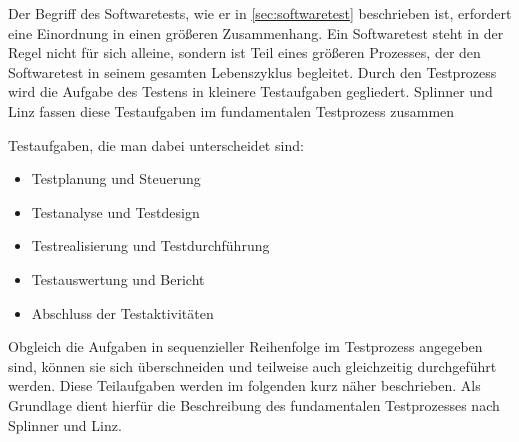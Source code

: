Der Begriff des Softwaretests, wie er in \ref{sec:softwaretest} beschrieben ist, erfordert eine Einordnung in einen größeren Zusammenhang. Ein Softwaretest steht in der Regel nicht für sich alleine, sondern ist Teil eines größeren Prozesses, der den Softwaretest in seinem gesamten Lebenszyklus begleitet.
Durch den Testprozess wird die Aufgabe des Testens in kleinere Testaufgaben gegliedert.
Splinner und Linz fassen diese Testaufgaben im fundamentalen Testprozess zusammen \cite{spillner_basiswissen_2007}


Testaufgaben, die man dabei unterscheidet sind:

\begin{itemize}
	  \itemsep0pt
      \item Testplanung und Steuerung
      \item Testanalyse und Testdesign
      \item Testrealisierung und Testdurchführung
      \item Testauswertung und Bericht
      \item Abschluss der Testaktivitäten       
\end{itemize}

Obgleich die Aufgaben in sequenzieller Reihenfolge im Testprozess angegeben sind, können sie sich überschneiden und teilweise auch gleichzeitig durchgeführt werden. Diese Teilaufgaben werden im folgenden kurz näher beschrieben. Als Grundlage dient hierfür die Beschreibung des fundamentalen Testprozesses nach Splinner und Linz. \cite[S.20ff]{spillner_basiswissen_2007}

